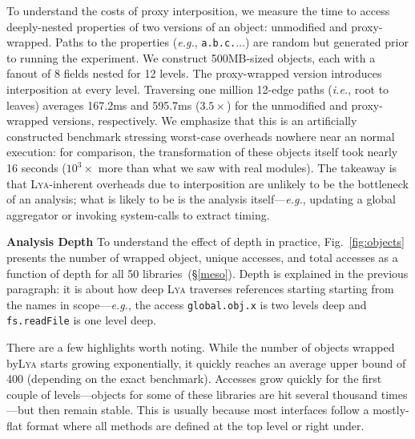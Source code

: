 \documentclass[letterpaper,twocolumn,10pt]{article}
\def\eg{{\em e.g.}, }
\def\ie{{\em i.e.}, }
\newcommand{\heading}[1]{\vspace{2pt}\noindent\textbf{#1}\enspace}
\newcommand{\ttt}[1]{\texttt{#1}}
\newcommand{\sx}[1]{(\S\ref{#1})}
\newcommand{\sys}{{\scshape Lya}\xspace}
\begin{document}
To understand the costs of proxy interposition, we measure the time to access deeply-nested properties of two versions of an object:
  unmodified and proxy-wrapped.
Paths to the properties (\eg \ttt{a.b.c.$\ldots$}) are random but generated prior to running the experiment.
We construct 500MB-sized objects, each with a fanout of 8 fields nested for 12 levels.
The proxy-wrapped version introduces interposition at every level.
Traversing one million 12-edge paths (\ie root to leaves) averages 167.2ms and 595.7ms ($3.5\times$) for the unmodified and proxy-wrapped versions, respectively.
% 
We emphasize that this is an artificially constructed benchmark stressing worst-case overheads nowhere near an normal execution:
  for comparison, the transformation of these objects itself took nearly 16 seconds ($10^3\times$ more than what we saw with real modules).
The takeaway is that \sys-inherent overheads due to interposition are unlikely to be the bottleneck of an analysis;
  what is likely to be is the analysis itself---\eg updating a global aggregator or invoking system-calls to extract timing.

\heading{Analysis Depth}
To understand the effect of depth in practice, Fig.~\ref{fig:objects} presents the number of wrapped object, unique accesses, and total accesses as a function of depth for all 50 libraries~\sx{meso}.
Depth is explained in the previous paragraph:
   it is about how deep \sys traverses references starting starting from the names in scope---\eg the access \ttt{global.obj.x} is two levels deep and \ttt{fs.readFile} is one level deep.

There are a few highlights worth noting.
While the number of objects wrapped by\sys starts growing exponentially, it quickly reaches an average upper bound of 400 (depending on the exact benchmark).
Accesses grow quickly for the first couple of levels---objects for some of these libraries are hit several thousand times---but then remain stable.
This is usually because most interfaces follow a mostly-flat format where all methods are defined at the top level or right under.
\end{document}
